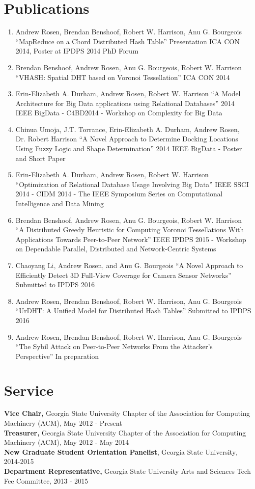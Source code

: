 \documentclass[12pt,a4paper]{article}
\begin{document}
\section*{Publications}
\begin{enumerate}
	\item Andrew Rosen, Brendan Benshoof, Robert W. Harrison, Anu G. Bourgeois
	``MapReduce on a Chord Distributed Hash Table''
	Presentation ICA CON 2014, Poster at IPDPS 2014 PhD Forum
	\item Brendan Benshoof, Andrew Rosen, Anu G. Bourgeois, Robert W. Harrison
	``VHASH: Spatial DHT based on Voronoi Tessellation''
	ICA CON 2014
	\item  Erin-Elizabeth A. Durham, Andrew Rosen, Robert W. Harrison
	``A Model Architecture for Big Data applications using Relational Databases''
	2014 IEEE BigData - C4BD2014 - Workshop on Complexity for Big Data
	\item Chinua Umoja, J.T. Torrance, Erin-Elizabeth A. Durham, Andrew Rosen, Dr. Robert Harrison
	``A Novel Approach to Determine Docking Locations Using Fuzzy Logic and Shape Determination''
	2014 IEEE BigData - Poster and Short Paper
	\item  Erin-Elizabeth A. Durham, Andrew Rosen, Robert W. Harrison
	``Optimization of Relational Database Usage Involving Big Data''
	IEEE SSCI 2014 - CIDM 2014 - The IEEE Symposium Series on Computational Intelligence and Data Mining
	\item Brendan Benshoof, Andrew Rosen, Anu G. Bourgeois, Robert W. Harrison
	``A Distributed Greedy Heuristic for Computing Voronoi Tessellations With Applications Towards Peer-to-Peer Network''
	IEEE IPDPS 2015 - Workshop on Dependable Parallel, Distributed and Network-Centric Systems
	\item Chaoyang Li, Andrew Rosen,  and Anu G. Bourgeois
	``A Novel Approach to Efficiently Detect 3D Full-View Coverage for Camera Sensor Networks''
	Submitted to IPDPS 2016 
	\item Andrew Rosen, Brendan Benshoof, Robert W. Harrison, Anu G. Bourgeois
	``UrDHT: A Unified Model for Distributed Hash Tables''
	Submitted to IPDPS 2016
	\item Andrew Rosen, Brendan Benshoof, Robert W. Harrison, Anu G. Bourgeois
	``The Sybil Attack on Peer-to-Peer Networks From the Attacker's Perspective''
	In preparation
	
\end{enumerate}


\section*{Service}
{\bf Vice Chair,} Georgia State University Chapter of the Association for Computing Machinery (ACM),  May 2012 - Present\\
{\bf Treasurer,} Georgia State University Chapter of the Association for Computing Machinery (ACM), May 2012 - May 2014\\
{\bf New Graduate Student Orientation Panelist}, Georgia State University, 2014-2015\\
{\bf Department Representative,} Georgia State University Arts and Sciences Tech Fee Committee, 2013 - 2015\\
\end{document}
